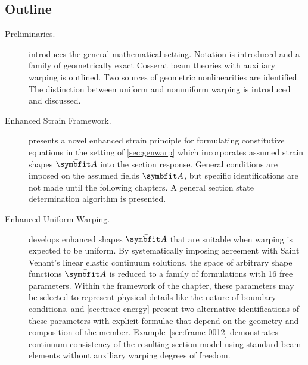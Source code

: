 \subsection{Outline}

\begin{description}
\item[Preliminaries.]
 introduces the general mathematical setting. 
Notation is introduced and a family of geometrically exact Cosserat beam theories with auxiliary warping is outlined. Two sources of geometric nonlinearities are identified.
The distinction between uniform and nonuniform warping is introduced and discussed. 


\item[Enhanced Strain Framework.]
 presents a novel enhanced strain principle for formulating constitutive equations in the setting of \cref{sec:genwarp} which incorporates assumed strain shapes \(\EnhanShapes\) into the section response. General conditions are imposed on the assumed fields \(\EnhanShapes\), but specific identifications are not made until the following chapters. A general section state determination algorithm is presented. 

\item[Enhanced Uniform Warping.]
 develops enhanced shapes \(\EnhanShapes\) that are suitable when warping is expected to be uniform. By systematically imposing agreement with Saint Venant's linear elastic continuum solutions, the space of arbitrary shape functions \(\EnhanShapes\) is reduced to a family of formulations with 16 free parameters. Within the framework of the chapter, these parameters may be selected to represent physical details like the nature of boundary conditions.  and \cref{sec:trace-energy} present two alternative identifications of these parameters with explicit formulae that depend on the geometry and composition of the member. 
Example~\ref{sec:frame-0012} demonstrates continuum consistency of the resulting section model using standard beam elements without auxiliary warping degrees of freedom.


\end{description}
